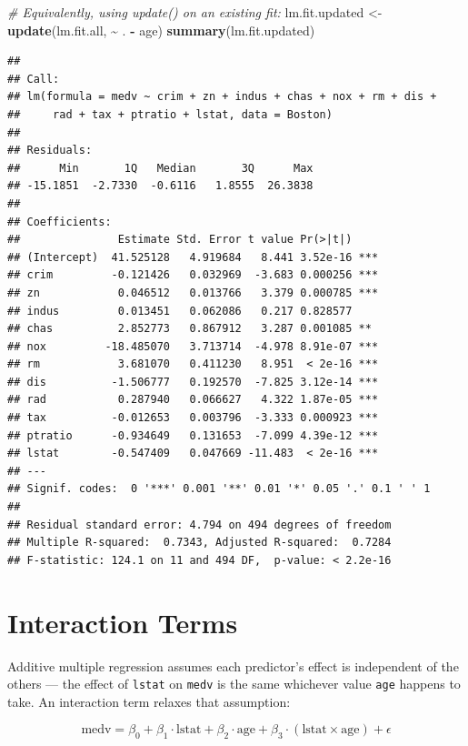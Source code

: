 \documentclass[
  11pt,
]{article}
\newenvironment{Shaded}{\begin{snugshade}}{\end{snugshade}}
\newcommand{\CommentTok}[1]{\textcolor[rgb]{0.56,0.35,0.01}{\textit{#1}}}
\newcommand{\FunctionTok}[1]{\textcolor[rgb]{0.13,0.29,0.53}{\textbf{#1}}}
\newcommand{\NormalTok}[1]{#1}
\newcommand{\OtherTok}[1]{\textcolor[rgb]{0.56,0.35,0.01}{#1}}
\newcommand{\SpecialCharTok}[1]{\textcolor[rgb]{0.81,0.36,0.00}{\textbf{#1}}}
\begin{document}
\begin{Shaded}
\begin{Highlighting}[]
\CommentTok{\# Equivalently, using update() on an existing fit:}
\NormalTok{lm.fit.updated }\OtherTok{\textless{}{-}} \FunctionTok{update}\NormalTok{(lm.fit.all, }\SpecialCharTok{\textasciitilde{}}\NormalTok{ . }\SpecialCharTok{{-}}\NormalTok{ age)}
\FunctionTok{summary}\NormalTok{(lm.fit.updated)}
\end{Highlighting}
\end{Shaded}

\begin{verbatim}
## 
## Call:
## lm(formula = medv ~ crim + zn + indus + chas + nox + rm + dis + 
##     rad + tax + ptratio + lstat, data = Boston)
## 
## Residuals:
##      Min       1Q   Median       3Q      Max 
## -15.1851  -2.7330  -0.6116   1.8555  26.3838 
## 
## Coefficients:
##               Estimate Std. Error t value Pr(>|t|)    
## (Intercept)  41.525128   4.919684   8.441 3.52e-16 ***
## crim         -0.121426   0.032969  -3.683 0.000256 ***
## zn            0.046512   0.013766   3.379 0.000785 ***
## indus         0.013451   0.062086   0.217 0.828577    
## chas          2.852773   0.867912   3.287 0.001085 ** 
## nox         -18.485070   3.713714  -4.978 8.91e-07 ***
## rm            3.681070   0.411230   8.951  < 2e-16 ***
## dis          -1.506777   0.192570  -7.825 3.12e-14 ***
## rad           0.287940   0.066627   4.322 1.87e-05 ***
## tax          -0.012653   0.003796  -3.333 0.000923 ***
## ptratio      -0.934649   0.131653  -7.099 4.39e-12 ***
## lstat        -0.547409   0.047669 -11.483  < 2e-16 ***
## ---
## Signif. codes:  0 '***' 0.001 '**' 0.01 '*' 0.05 '.' 0.1 ' ' 1
## 
## Residual standard error: 4.794 on 494 degrees of freedom
## Multiple R-squared:  0.7343, Adjusted R-squared:  0.7284 
## F-statistic: 124.1 on 11 and 494 DF,  p-value: < 2.2e-16
\end{verbatim}

\section{Interaction Terms}\label{interaction-terms}

Additive multiple regression assumes each predictor's effect is
independent of the others --- the effect of \texttt{lstat} on
\texttt{medv} is the same whichever value \texttt{age} happens to take.
An interaction term relaxes that assumption:

\[
\text{medv} = \beta_0 + \beta_1 \cdot \text{lstat} + \beta_2 \cdot \text{age} + \beta_3 \cdot (\text{lstat} \times \text{age}) + \epsilon
\]
\end{document}
